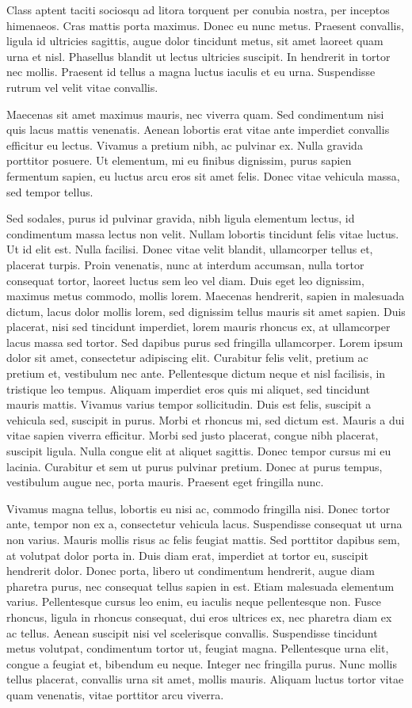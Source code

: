 Class aptent taciti sociosqu ad litora torquent per conubia nostra, per inceptos himenaeos. Cras mattis porta maximus. Donec eu nunc metus. Praesent convallis, ligula id ultricies sagittis, augue dolor tincidunt metus, sit amet laoreet quam urna et nisl. Phasellus blandit ut lectus ultricies suscipit. In hendrerit in tortor nec mollis. Praesent id tellus a magna luctus iaculis et eu urna. Suspendisse rutrum vel velit vitae convallis.

Maecenas sit amet maximus mauris, nec viverra quam. Sed condimentum nisi quis lacus mattis venenatis. Aenean lobortis erat vitae ante imperdiet convallis efficitur eu lectus. Vivamus a pretium nibh, ac pulvinar ex. Nulla gravida porttitor posuere. Ut elementum, mi eu finibus dignissim, purus sapien fermentum sapien, eu luctus arcu eros sit amet felis. Donec vitae vehicula massa, sed tempor tellus.

Sed sodales, purus id pulvinar gravida, nibh ligula elementum lectus, id condimentum massa lectus non velit. Nullam lobortis tincidunt felis vitae luctus. Ut id elit est. Nulla facilisi. Donec vitae velit blandit, ullamcorper tellus et, placerat turpis. Proin venenatis, nunc at interdum accumsan, nulla tortor consequat tortor, laoreet luctus sem leo vel diam. Duis eget leo dignissim, maximus metus commodo, mollis lorem. Maecenas hendrerit, sapien in malesuada dictum, lacus dolor mollis lorem, sed dignissim tellus mauris sit amet sapien. Duis placerat, nisi sed tincidunt imperdiet, lorem mauris rhoncus ex, at ullamcorper lacus massa sed tortor. Sed dapibus purus sed fringilla ullamcorper.
Lorem ipsum dolor sit amet, consectetur adipiscing elit. Curabitur felis velit, pretium ac pretium et, vestibulum nec ante. Pellentesque dictum neque et nisl facilisis, in tristique leo tempus. Aliquam imperdiet eros quis mi aliquet, sed tincidunt mauris mattis. Vivamus varius tempor sollicitudin. Duis est felis, suscipit a vehicula sed, suscipit in purus. Morbi et rhoncus mi, sed dictum est. Mauris a dui vitae sapien viverra efficitur. Morbi sed justo placerat, congue nibh placerat, suscipit ligula. Nulla congue elit at aliquet sagittis. Donec tempor cursus mi eu lacinia. Curabitur et sem ut purus pulvinar pretium. Donec at purus tempus, vestibulum augue nec, porta mauris. Praesent eget fringilla nunc.

Vivamus magna tellus, lobortis eu nisi ac, commodo fringilla nisi. Donec tortor ante, tempor non ex a, consectetur vehicula lacus. Suspendisse consequat ut urna non varius. Mauris mollis risus ac felis feugiat mattis. Sed porttitor dapibus sem, at volutpat dolor porta in. Duis diam erat, imperdiet at tortor eu, suscipit hendrerit dolor. Donec porta, libero ut condimentum hendrerit, augue diam pharetra purus, nec consequat tellus sapien in est. Etiam malesuada elementum varius. Pellentesque cursus leo enim, eu iaculis neque pellentesque non. Fusce rhoncus, ligula in rhoncus consequat, dui eros ultrices ex, nec pharetra diam ex ac tellus. Aenean suscipit nisi vel scelerisque convallis. Suspendisse tincidunt metus volutpat, condimentum tortor ut, feugiat magna. Pellentesque urna elit, congue a feugiat et, bibendum eu neque. Integer nec fringilla purus. Nunc mollis tellus placerat, convallis urna sit amet, mollis mauris. Aliquam luctus tortor vitae quam venenatis, vitae porttitor arcu viverra.
